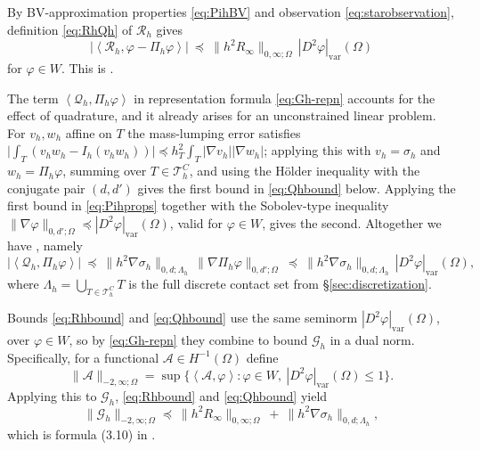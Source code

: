 \documentclass[12pt]{amsart}
\numberwithin{equation}{section}
\theoremstyle{plain}
\theoremstyle{definition}
\theoremstyle{remark}
\newcommand{\Om}{\Omega}
\newcommand{\Th}{\mathcal{T}_h}
\newcommand{\Ih}{I_h}
\newcommand{\Pih}{\Pi_h}
\newcommand{\ThC}{\Th^C}
\newcommand{\Gh}{\mathcal{G}_h}
\newcommand{\Rh}{\mathcal{R}_h}
\newcommand{\Qh}{\mathcal{Q}_h}
\newcommand{\Lamh}{\Lambda_h}
\begin{document}
By BV-approximation properties \eqref{eq:PihBV} and observation \eqref{eq:starobservation}, definition \eqref{eq:RhQh} of $\Rh$ gives
\begin{equation}
\label{eq:Rhbound}
  \bigl|\left<\Rh,\varphi-\Pih\varphi\right>\bigr| \ \preceq\ \|h^2 R_\infty\|_{0,\infty;\Om}\, |D^2\varphi|_{\mathrm{var}}(\Om)
\end{equation}
for $\varphi \in W$.  This is \cite[formula (3.8)]{NSV03}.

The term $\left<\Qh,\Pih\varphi\right>$ in representation formula \eqref{eq:Gh-repn} accounts for the effect of quadrature, and it already arises for an unconstrained linear problem.  For $v_h,w_h$ affine on $T$ the mass-lumping error satisfies $\bigl|\int_T (v_h w_h - \Ih(v_h w_h))\bigr| \preceq h_T^2 \int_T |\nabla v_h| |\nabla w_h|$; applying this with $v_h = \sigma_h$ and $w_h = \Pih\varphi$, summing over $T \in \ThC$, and using the H\"older inequality with the conjugate pair $(d,d')$ gives the first bound in \eqref{eq:Qhbound} below.  Applying the first bound in \eqref{eq:Pihprops} together with the Sobolev-type inequality $\|\nabla\varphi\|_{0,d';\Om} \preceq |D^2\varphi|_{\mathrm{var}}(\Om)$, valid for $\varphi \in W$, gives the second.  Altogether we have \cite[formula (3.9)]{NSV03}, namely
\begin{equation}
\label{eq:Qhbound}
  \bigl|\left<\Qh,\Pih\varphi\right>\bigr| \ \preceq\ \|h^2\nabla\sigma_h\|_{0,d;\Lamh}\, \|\nabla\Pih\varphi\|_{0,d';\Om}
  \ \preceq\ \|h^2\nabla\sigma_h\|_{0,d;\Lamh}\, |D^2\varphi|_{\mathrm{var}}(\Om),
\end{equation}
where $\Lamh = \bigcup_{T\in\ThC} T$ is the full discrete contact set from \S \ref{sec:discretization}.

Bounds \eqref{eq:Rhbound} and \eqref{eq:Qhbound} use the same seminorm $|D^2\varphi|_{\mathrm{var}}(\Om)$, over $\varphi\in W$, so by \eqref{eq:Gh-repn} they combine to bound $\Gh$ in a dual norm.  Specifically, for a functional $\mathcal{A} \in H^{-1}(\Om)$ define
\begin{equation}
\label{eq:dualnormbv}
\|\mathcal{A}\|_{-2,\infty;\Om} = \sup\bigl\{\left<\mathcal{A},\varphi\right> : \varphi\in W,\ |D^2\varphi|_{\mathrm{var}}(\Om)\le 1\bigr\}.
\end{equation}
Applying this to $\Gh$, \eqref{eq:Rhbound} and \eqref{eq:Qhbound} yield
\begin{equation}
\label{eq:Ghbound}
  \|\Gh\|_{-2,\infty;\Om} \preceq\ \|h^2 R_\infty\|_{0,\infty;\Om} \ +\ \|h^2\nabla\sigma_h\|_{0,d;\Lamh},
\end{equation}
which is formula (3.10) in \cite{NSV03}.
\end{document}
